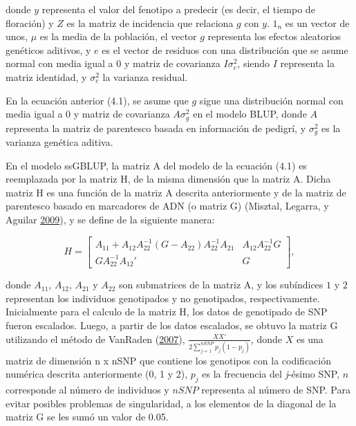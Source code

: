\documentclass[11pt,spanish,a4paper,oneside,]{book} %
\begin{document}
donde \(y\) representa el valor del fenotipo a predecir (es decir, el tiempo de floración) y \(Z\) es la matriz de incidencia que relaciona \(g\) con \(y\). \(1_{n}\) es un vector de unos, \(\mu\) es la media de la población, el vector \(g\) representa los efectos aleatorios genéticos aditivos, y \(e\) es el vector de residuos con una distribución que se asume normal con media igual a \(0\) y matriz de covarianza \(I\sigma^{2}_{e}\), siendo \(I\) representa la matriz identidad, y \(\sigma_{e}^{2}\) la varianza residual.

En la ecuación anterior (4.1), se asume que \(g\) sigue una distribución normal con media igual a \(0\) y matriz de covarianza \(A\sigma^{2}_{g}\) en el modelo BLUP, donde \(A\) representa la matriz de parentesco basada en información de pedigrí, y \(\sigma^{2}_{g}\) es la varianza genética aditiva.

En el modelo ssGBLUP, la matriz A del modelo de la ecuación (4.1) es reemplazada por la matriz H, de la misma dimensión que la matriz A. Dicha matriz H es una función de la matriz A descrita anteriormente y de la matriz de parentesco basado en marcadores de ADN (o matriz G) (Misztal, Legarra, y Aguilar \protect\hyperlink{ref-cite:16}{2009}), y se define de la siguiente manera:

\begin{equation}
H =
\begin{bmatrix}
A_{11} + A_{12} A_{22}^{-1} ( G - A_{22} ) A_{22}^{-1}  A_{21} & A_{12} A_{22}^{-1} G \\ 
G A_{22}^{-1} A_{12}' & G 
\end{bmatrix}
,
\end{equation}

donde \(A_{11}\), \(A_{12}\), \(A_{21}\) y \(A_{22}\) son submatrices de la matriz A, y los subíndices \(1\) y \(2\) representan los individuos genotipados y no genotipados, respectivamente. Inicialmente para el calculo de la matriz H, los datos de genotipado de SNP fueron escalados. Luego, a partir de los datos escalados, se obtuvo la matriz G utilizando el método de VanRaden (\protect\hyperlink{ref-cite:39}{2007}), \(\frac{XX'}{2 \sum_{j=1}^{nSNP} p_{j} (1 - p_{j})}\), donde \(X\) es una matriz de dimensión n x nSNP que contiene los genotipos con la codificación numérica descrita anteriormente (0, 1 y 2), \(p_{j}\) es la frecuencia del \emph{j}-ésimo SNP, \(n\) corresponde al número de individuos y \(nSNP\) representa al número de SNP. Para evitar posibles problemas de singularidad, a los elementos de la diagonal de la matriz G se les sumó un valor de 0.05.
\end{document}
